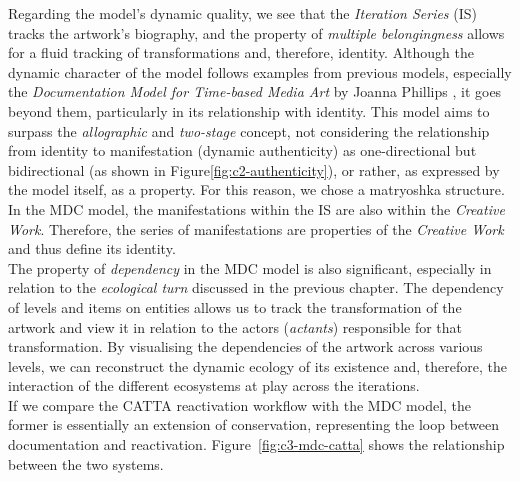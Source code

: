 Regarding the model’s dynamic quality, we see that the \textit{Iteration Series} (IS) tracks the artwork’s biography, and the property of \textit{multiple belongingness} allows for a fluid tracking of transformations and, therefore, identity. Although the dynamic character of the model follows examples from previous models, especially the \textit{Documentation Model for Time-based Media Art} by Joanna Phillips \cite{phillips2015reporting}, it goes beyond them, particularly in its relationship with identity. This model aims to surpass the \textit{allographic} and \textit{two-stage} concept, not considering the relationship from identity to manifestation (dynamic authenticity) as one-directional but bidirectional (as shown in Figure\~\ref{fig:c2-authenticity}), or rather, as expressed by the model itself, as a property. For this reason, we chose a matryoshka structure. In the MDC model, the manifestations within the IS are also within the \textit{Creative Work}. Therefore, the series of manifestations are properties of the \textit{Creative Work} and thus define its identity.\\
The property of \textit{dependency} in the MDC model is also significant, especially in relation to the \textit{ecological turn} discussed in the previous chapter. The dependency of levels and items on entities allows us to track the transformation of the artwork and view it in relation to the actors (\textit{actants}) responsible for that transformation. By visualising the dependencies of the artwork across various levels, we can reconstruct the dynamic ecology of its existence and, therefore, the interaction of the different ecosystems at play across the iterations.\\
If we compare the CATTA reactivation workflow with the MDC model, the former is essentially an extension of conservation, representing the loop between documentation and reactivation. Figure~\ref{fig:c3-mdc-catta} shows the relationship between the two systems.
